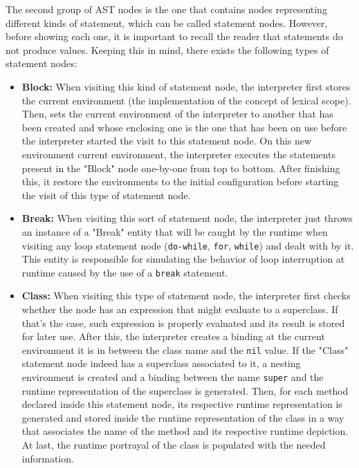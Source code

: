 The second group of AST nodes is the one that contains nodes representing different kinds of statement, which can be called statement nodes. However, before showing each one, it is important to recall the reader that statements do not produce values. Keeping this in mind, there exists the following types of statement nodes:
\begin{itemize}
    \item \textbf{Block:} When visiting this kind of statement node, the interpreter first stores the current environment (the implementation of the concept of lexical scope). Then, sets the current environment of the interpreter to another that has been created and whose enclosing one is the one that has been on use before the interpreter started the visit to this statement node. On this new environment current environment, the interpreter executes the statements present in the "Block" node one-by-one from top to bottom. After finishing this, it restore the environments to the initial configuration before starting the visit of this type of statement node.
    \item \textbf{Break:} When visiting this sort of statement node, the interpreter just throws an instance of a "Break" entity that will be caught by the runtime when visiting any loop statement node (\texttt{do-while}, \texttt{for}, \texttt{while}) and dealt with by it. This entity is responsible for simulating the behavior of loop interruption at runtime caused by the use of a \texttt{break} statement.
    
    \item \textbf{Class:} When visiting this type of statement node, the interpreter first checks whether the node has an expression that might evaluate to a superclass. If that's the case, such expression is properly evaluated and its result is stored for later use. After this, the interpreter creates a binding at the current environment it is in between the class name and the \texttt{nil} value. If the "Class" statement node indeed has a superclass associated to it, a nesting environment is created and a binding between the name \texttt{super} and the runtime representation of the superclass is generated. Then, for each method declared inside this statement node, its respective runtime representation is generated and stored inside the runtime representation of the class in a way that associates the name of the method and its respective runtime depiction. At last, the runtime portrayal of the class is populated with the needed information.
    

\end{itemize}
